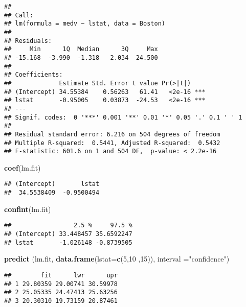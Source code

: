 \documentclass[
]{article}
\newenvironment{Shaded}{\begin{snugshade}}{\end{snugshade}}
\newcommand{\DataTypeTok}[1]{\textcolor[rgb]{0.13,0.29,0.53}{#1}}
\newcommand{\DecValTok}[1]{\textcolor[rgb]{0.00,0.00,0.81}{#1}}
\newcommand{\KeywordTok}[1]{\textcolor[rgb]{0.13,0.29,0.53}{\textbf{#1}}}
\newcommand{\NormalTok}[1]{#1}
\newcommand{\StringTok}[1]{\textcolor[rgb]{0.31,0.60,0.02}{#1}}
\begin{document}
\begin{verbatim}
## 
## Call:
## lm(formula = medv ~ lstat, data = Boston)
## 
## Residuals:
##     Min      1Q  Median      3Q     Max 
## -15.168  -3.990  -1.318   2.034  24.500 
## 
## Coefficients:
##             Estimate Std. Error t value Pr(>|t|)    
## (Intercept) 34.55384    0.56263   61.41   <2e-16 ***
## lstat       -0.95005    0.03873  -24.53   <2e-16 ***
## ---
## Signif. codes:  0 '***' 0.001 '**' 0.01 '*' 0.05 '.' 0.1 ' ' 1
## 
## Residual standard error: 6.216 on 504 degrees of freedom
## Multiple R-squared:  0.5441, Adjusted R-squared:  0.5432 
## F-statistic: 601.6 on 1 and 504 DF,  p-value: < 2.2e-16
\end{verbatim}

\begin{Shaded}
\begin{Highlighting}[]
\KeywordTok{coef}\NormalTok{(lm.fit)}
\end{Highlighting}
\end{Shaded}

\begin{verbatim}
## (Intercept)       lstat 
##  34.5538409  -0.9500494
\end{verbatim}

\begin{Shaded}
\begin{Highlighting}[]
\KeywordTok{confint}\NormalTok{(lm.fit)}
\end{Highlighting}
\end{Shaded}

\begin{verbatim}
##                 2.5 %     97.5 %
## (Intercept) 33.448457 35.6592247
## lstat       -1.026148 -0.8739505
\end{verbatim}

\begin{Shaded}
\begin{Highlighting}[]
\KeywordTok{predict}\NormalTok{ (lm.fit, }\KeywordTok{data.frame}\NormalTok{(}\DataTypeTok{lstat=}\KeywordTok{c}\NormalTok{(}\DecValTok{5}\NormalTok{,}\DecValTok{10}\NormalTok{ ,}\DecValTok{15}\NormalTok{)), }\DataTypeTok{interval =}\StringTok{"confidence"}\NormalTok{)}
\end{Highlighting}
\end{Shaded}

\begin{verbatim}
##        fit      lwr      upr
## 1 29.80359 29.00741 30.59978
## 2 25.05335 24.47413 25.63256
## 3 20.30310 19.73159 20.87461
\end{verbatim}
\end{document}

